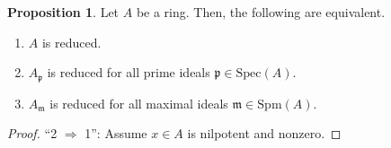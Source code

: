 \documentclass[a4paper]{book}
\theoremstyle{definition}
\newtheorem{proposition}[definition]{Proposition}
\begin{document}
\begin{thmbox}
    \begin{proposition}
        Let \(A\) be a ring. Then, the following are equivalent.
        \begin{enumerate}
            \item \(A\) is reduced.
            \item \(A_\mathfrak{p}\) is reduced for all prime ideals \(\mathfrak{p} \in \mathrm{Spec}(A)\).
            \item \(A_\mathfrak{m}\) is reduced for all maximal ideals \(\mathfrak{m} \in \mathrm{Spm}(A)\).
        \end{enumerate}
    \end{proposition}
\end{thmbox}
\begin{proof}
    ``2 \(\Rightarrow\) 1'': Assume \(x \in A\) is nilpotent and nonzero.
\end{proof}
\end{document}
